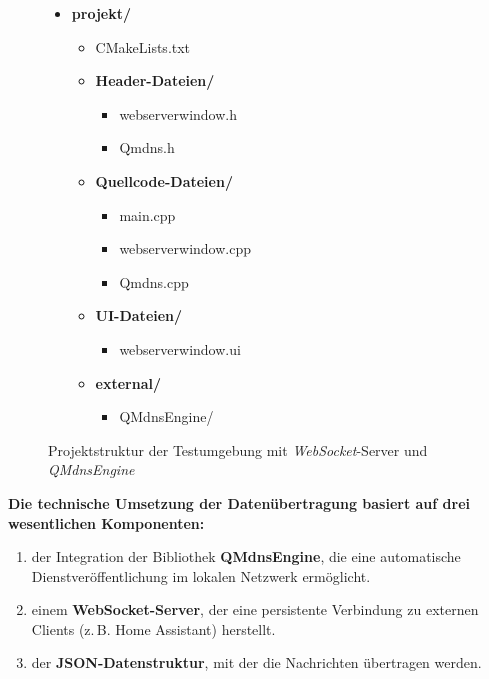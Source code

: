 \begin{figure}[H]
\centering
\begin{minipage}{0.75\textwidth}
\begin{itemize}
  \item \textbf{projekt/}
  \begin{itemize}
    \item CMakeLists.txt
    \item \textbf{Header-Dateien/}
    \begin{itemize}
      \item webserverwindow.h
      \item Qmdns.h
    \end{itemize}
    \item \textbf{Quellcode-Dateien/}
    \begin{itemize}
      \item main.cpp
      \item webserverwindow.cpp
      \item Qmdns.cpp
    \end{itemize}
    \item \textbf{UI-Dateien/}
    \begin{itemize}
      \item webserverwindow.ui
    \end{itemize}
    \item \textbf{external/}
    \begin{itemize}
      \item QMdnsEngine/
    \end{itemize}
  \end{itemize}
\end{itemize}
\end{minipage}
\caption{Projektstruktur der Testumgebung mit \textit{WebSocket}-Server und \textit{QMdnsEngine}}
\label{fig:projektstruktur}
\end{figure}
\vspace{1cm}
\textbf{\large Die technische Umsetzung der Datenübertragung basiert auf drei wesentlichen Komponenten:} 
\begin{enumerate}
  \item der Integration der Bibliothek \textbf{QMdnsEngine}, die eine automatische 
  Dienstveröffentlichung im lokalen Netzwerk ermöglicht.\\
  \item einem \textbf{WebSocket-Server}, der eine persistente Verbindung zu externen Clients (z.\,B. Home Assistant) herstellt.\\
  \item der \textbf{JSON-Datenstruktur}, mit der die Nachrichten übertragen werden.
\end{enumerate}

